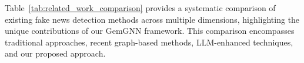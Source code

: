 Table~\ref{tab:related_work_comparison} provides a systematic comparison of existing fake news detection methods across multiple dimensions, highlighting the unique contributions of our GemGNN framework. This comparison encompasses traditional approaches, recent graph-based methods, LLM-enhanced techniques, and our proposed approach.







